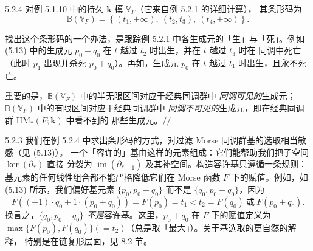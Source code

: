 
\begin{wexam}{5.2.4}
对例 5.1.10 中的持久 $\mathbf k$-模 $\mathbb V_F$（它来自例 5.2.1 的详细计算），
其条形码为
\[
\mathbb B(\mathbb V_F)=\left\{(t_1,+\infty),\ (t_2,t_3),\ (t_4,+\infty)\right\}.
\]


找出这个条形码的一个办法，是跟踪例 5.2.1 中各生成元的「生」与「死」。例如
(5.13) 中的生成元 $p_0+q_0$ 在 $t$ 越过 $t_2$ 时出生，并在 $t$ 越过 $t_3$ 时在
同调中死亡（此时 $p_1$ 出现并杀死 $p_0+q_0$）。再如，生成元 $p_0$ 在 $t$ 越过
$t_1$ 时出生，且永不死亡。

重要的是，$\mathbb B(\mathbb V_F)$ 中的半无限区间对应于经典同调群中
\emph{同调可见的}生成元；$\mathbb B(\mathbb V_F)$ 中的有限区间对应于经典同调群中
\emph{同调不可见的}生成元，即在经典同调群 $\mathrm{HM}_*(F;\mathbf k)$ 中看不到的
那些生成元。\hfill$//$
\end{wexam}

\begin{wrem}{5.2.3}
我们在例 5.2.4 中求出条形码的方式，对过滤 Morse 同调群基的选取相当敏感（见 (5.13)）。
一个「容许的」基由这样的元素组成：它们能帮助我们把子空间 $\ker(\partial_*)$ 直接
分裂为 $\operatorname{im}(\partial_{*+1})$ 及其补空间。构造容许基只遵循一条规则：
基元素的任何线性组合都不能严格降低它们在 Morse 函数 $F$ 下的赋值。例如，如 (5.13)
所示，我们偏好基元素 $\{p_0,p_0+q_0\}$ 而不是 $\{q_0,p_0+
q_0\}$，因为
\[
F\left((-1)\cdot q_0+1\cdot(p_0+q_0)\right)
=F(p_0)=t_1<t_2=F(q_0)\ \text{或}\ F(p_0+q_0).
\]
换言之，$\{q_0,p_0+q_0\}$ \emph{不是}容许基。这里，$p_0+q_0$ 在 $F$ 下的赋值定义为
$\max\{F(p_0),F(q_0)\}(=t_2)$（总是取「最大」）。关于基选取的更自然的解释，
特别是在链复形层面，见 8.2 节。
\end{wrem}


